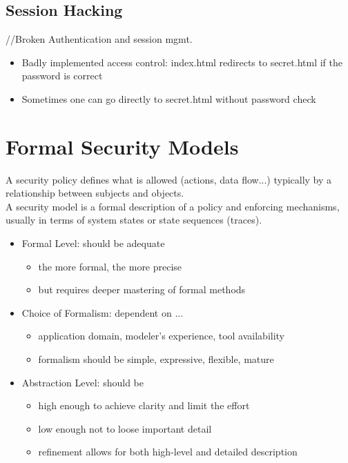 \documentclass[a4paper, 12pt]{article}
\begin{document}
\subsection{Session Hacking}
//Broken Authentication and session mgmt.
\begin{itemize}
\item Badly implemented access control: index.html redirects to secret.html if the password is correct
\item Sometimes one can go directly to secret.html without password check
\end{itemize}

\section{Formal Security Models}
A security policy defines what is allowed (actions, data flow...) typically by a relationship between subjects and objects.\\
A security model is a formal description of a policy and enforcing mechanisms, usually in terms of system states or state sequences (traces).\\

\begin{itemize}
\item Formal Level: should be adequate
\begin{itemize}
\item the more formal, the more precise
\item but requires deeper mastering of formal methods
\end{itemize}
\item Choice of Formalism: dependent on ...
\begin{itemize}
\item application domain, modeler's experience, tool availability
\item formalism should be simple, expressive, flexible, mature
\end{itemize}
\item Abstraction Level: should be
\begin{itemize}
\item high enough to achieve clarity and limit the effort
\item low enough not to loose important detail
\item refinement allows for both high-level and detailed description
\end{itemize}
\end{itemize}
\end{document}
